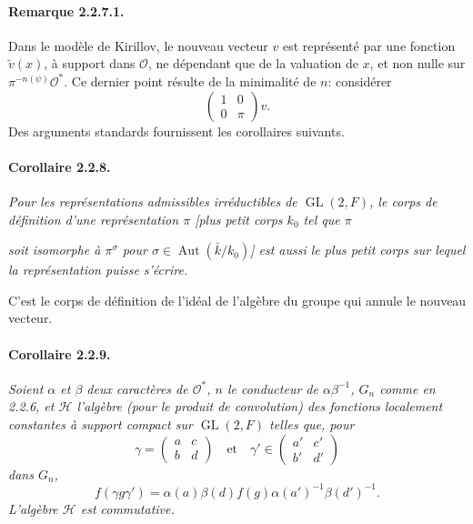 \documentclass[10pt,a4paper]{article}
\providecommand{\GL}{\operatorname{GL}}
\providecommand{\Aut}{\operatorname{Aut}}
\providecommand{\OO}{\mathcal O}
\providecommand{\calH}{\mathcal H}
\begin{document}
\paragraph{Remarque 2.2.7.1.} Dans le modèle de Kirillov, le nouveau vecteur \(v\) est représenté par une fonction \(\tilde v(x)\), à support dans \(\OO\), ne dépendant que de la valuation de \(x\), et non nulle sur \(\pi^{-n(\psi)}\OO^*\). Ce dernier point résulte de la minimalité de \(n\): considérer
\[
\begin{pmatrix}1&0\\0&\pi\end{pmatrix}v.
\]
Des arguments standards fournissent les corollaires suivants.

\paragraph{Corollaire 2.2.8.}{\itshape  Pour les représentations admissibles irréductibles de \(\GL(2,F)\), le corps de définition d'une représentation \(\pi\) [plus petit corps \(k_0\) tel que \(\pi\)\par}

\clearpage
{}
\hypertarget{authority-29}{}
{\itshape soit isomorphe à \(\pi^\sigma\) pour \(\sigma\in\Aut(\bar{k}/k_0)\)] est aussi le plus petit corps sur lequel la représentation puisse s'écrire.\par}

C'est le corps de définition de l'idéal de l'algèbre du groupe qui annule le nouveau vecteur.

\paragraph{Corollaire 2.2.9.}{\itshape  Soient \(\alpha\) et \(\beta\) deux caractères de \(\OO^*\), \(n\) le conducteur de \(\alpha\beta^{-1}\), \(G_n\) comme en 2.2.6, et \(\calH\) l'algèbre (pour le produit de convolution) des fonctions localement constantes à support compact sur \(\GL(2,F)\) telles que, pour
\[
\gamma=\begin{pmatrix}a&c\\b&d\end{pmatrix}
\quad\text{et}\quad
\gamma'\in\begin{pmatrix}a'&c'\\b'&d'\end{pmatrix}
\]
dans \(G_n\),
\[
f(\gamma g\gamma')=
\alpha(a)\beta(d)f(g)\alpha(a')^{-1}\beta(d')^{-1}.
\]
L'algèbre \(\calH\) est commutative.\par}
\end{document}
